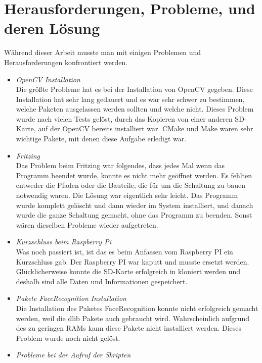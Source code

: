 	\section{Herausforderungen, Probleme, und deren Lösung}
	W{\"a}hrend dieser Arbeit musste man mit einigen Problemen und Herausforderungen konfrontiert werden.
	\begin{itemize}
		\item \textit{OpenCV Installation}\\
		
		Die gr{\"o}ßte Probleme hat es bei der Installation von OpenCV gegeben. Diese Installation hat sehr lang gedauert und es war sehr schwer zu bestimmen, welche Paketen ausgelassen werden sollten und welche nicht. Dieses Problem wurde nach vielen Tests gel{\"o}st, durch das Kopieren von einer anderen SD-Karte, auf der OpenCV bereits installiert war. CMake und Make waren sehr wichtige Pakete, mit denen diese Aufgabe erledigt war.
		\item \textit{Fritzing} \\
		
		Das Problem beim Fritzing war folgendes, dass jedes Mal wenn das Programm beendet wurde, konnte es nicht mehr ge{\"o}ffnet werden. Es fehlten entweder die Pfaden oder die Bauteile, die f{\"u}r um die Schaltung zu bauen notwendig waren. Die L{\"o}sung war eigentlich sehr leicht. Das Programm wurde komplett gel{\"o}scht und dann wieder im System installiert, und danach wurde die ganze Schaltung gemacht, ohne das Programm zu beenden. Sonst wären dieselben Probleme wieder aufgetreten.
		\item \textit{Kurzschluss beim Raspberry Pi}\\
		
		Was noch passiert ist, ist das es beim Anfassen vom Raspberry PI ein Kurzschluss gab. Der Raspberry PI war kaputt und musste ersetzt werden. Glücklicherweise konnte die SD-Karte erfolgreich in kloniert werden und deshalb sind alle Daten und Informationen gespeichert.
		\item \textit{Pakete FaceRecognition Installation} \\
		
		Die Installation des Paketes FaceRecognition konnte nicht erfolgreich gemacht werden, weil die dlib Pakete auch gebraucht wird. Wahrscheinlich aufgrund des zu geringen RAMs kann diese Pakete nicht installiert werden. Dieses Problem wurde noch nicht gel{\"o}st.
		\item \textit{Probleme bei der Aufruf der Skripten } \\
		

\end{itemize}
